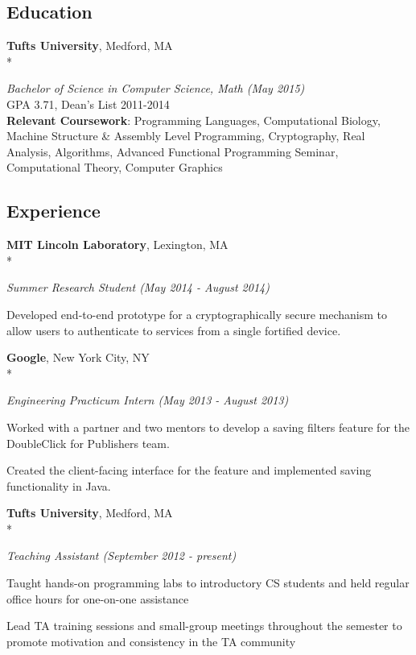 \documentclass{article}
\newcommand{\position}[2]{
  \textit{#1 (#2)}
}
\newcommand{\affiliation}[2]{
  \textbf{#1}, #2 \\*
}
\newenvironment{achievements}{
  \begin{compactitem} }{
  \end{compactitem}
}
\newcommand{\skill}[2]{
  \textbf{#1}: #2
  \smallskip
}
\begin{document}
\subsection*{Education}
  \affiliation{Tufts University}                             {Medford, MA}
    \position{Bachelor of Science in Computer Science, Math} {May 2015} \\
  GPA 3.71, Dean's List 2011-2014 \\
  \skill{Relevant Coursework}
        {Programming Languages, Computational Biology, Machine Structure \&
        Assembly Level Programming, Cryptography, Real Analysis, Algorithms,
        Advanced Functional Programming Seminar, Computational Theory, 
        Computer Graphics}

\subsection*{Experience}
  \affiliation{MIT Lincoln Laboratory}       {Lexington, MA}
    \position {Summer Research Student}      {May 2014 - August 2014}
    \begin{achievements}
      \item Developed end-to-end prototype for a cryptographically secure
      mechanism to allow users to authenticate to services from a single
      fortified device.
    \end{achievements}
    \smallskip

  \affiliation{Google}                       {New York City, NY}
    \position {Engineering Practicum Intern} {May 2013 - August 2013}
    \begin{achievements}
      \item Worked with a partner and two mentors to develop a
            saving filters feature for the \\ DoubleClick for Publishers team.
      \item Created the client-facing interface for the feature and
      implemented saving functionality in Java.
    \end{achievements}
    \smallskip

  \affiliation{Tufts University}   {Medford, MA}
    \position {Teaching Assistant} {September 2012 - present}
    \begin{achievements}
      \item Taught hands-on programming labs to introductory CS students and
      held regular office hours for one-on-one assistance
      \item Lead TA training sessions and small-group meetings throughout the
      semester to promote motivation and consistency in the TA community
    \end{achievements}
    \smallskip
\end{document}
